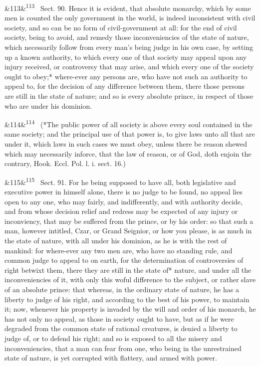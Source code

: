 \documentclass[12pt]{article}
\newcommand{\para}[1][]{\par\noindent\ifx&#1&\else\textsuperscript{\footnotesize #1}~\fi}
\begin{document}
\para[113] Sect. 90. Hence it is evident, that absolute monarchy, which by some men is counted the only government in the world, is indeed inconsistent with civil society, and so can be no form of civil-government at all: for the end of civil society, being to avoid, and remedy those inconveniencies of the state of nature, which necessarily follow from every man's being judge in his own case, by setting up a known authority, to which every one of that society may appeal upon any injury received, or controversy that may arise, and which every one of the society ought to obey;* where-ever any persons are, who have not such an authority to appeal to, for the decision of any difference between them, there those persons are still in the state of nature; and so is every absolute prince, in respect of those who are under his dominion.

\para[114] (*The public power of all society is above every soul contained in the same society; and the principal use of that power is, to give laws unto all that are under it, which laws in such cases we must obey, unless there be reason shewed which may necessarily inforce, that the law of reason, or of God, doth enjoin the contrary, Hook. Eccl. Pol. l. i. sect. 16.)

\para[115] Sect. 91. For he being supposed to have all, both legislative and executive power in himself alone, there is no judge to be found, no appeal lies open to any one, who may fairly, and indifferently, and with authority decide, and from whose decision relief and redress may be expected of any injury or inconviency, that may be suffered from the prince, or by his order: so that such a man, however intitled, Czar, or Grand Seignior, or how you please, is as much in the state of nature, with all under his dominion, as he is with the rest of mankind: for where-ever any two men are, who have no standing rule, and common judge to appeal to on earth, for the determination of controversies of right betwixt them, there they are still in the state of* nature, and under all the inconveniencies of it, with only this woful difference to the subject, or rather slave of an absolute prince: that whereas, in the ordinary state of nature, he has a liberty to judge of his right, and according to the best of his power, to maintain it; now, whenever his property is invaded by the will and order of his monarch, he has not only no appeal, as those in society ought to have, but as if he were degraded from the common state of rational creatures, is denied a liberty to judge of, or to defend his right; and so is exposed to all the misery and inconveniencies, that a man can fear from one, who being in the unrestrained state of nature, is yet corrupted with flattery, and armed with power.
\end{document}
